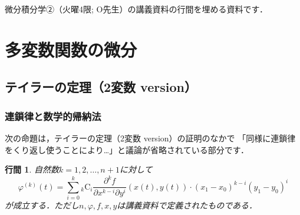 \documentclass{article}
\newtheorem{lemma}{行間}
\newcommand{\combination}[2]{{}_{#1} \mathrm{C}_{#2}}
\begin{document}
微分積分学②（火曜4限; O先生）の講義資料の行間を埋める資料です．
\tableofcontents
\newpage

\setcounter{section}{1}
\section{多変数関数の微分}
\setcounter{subsection}{7}
\subsection{テイラーの定理（2変数 version）}

\subsubsection{連鎖律と数学的帰納法}
次の命題は，テイラーの定理（2変数 version）の証明のなかで
「同様に連鎖律をくり返し使うことにより…」と議論が省略されている部分です．
\begin{screen}
    \begin{lemma}
        自然数$k=1,2,\dots,n+1$に対して
        \begin{equation}
            \label{lemma:1}
            \varphi^{(k)}(t)
            =
            \sum_{i=0}^{k}
                \combination{k}{i}
                \frac{\partial^k f}{\partial x^{k-i} \partial y^{i}} (x(t), y(t))
                \cdot
                (x_1 - x_0)^{k-i}
                (y_1 - y_0)^{i}
        \end{equation}
        が成立する．ただし$n, \varphi, f, x, y$は講義資料で定義されたものである．
    \end{lemma}
\end{screen}
\end{document}
